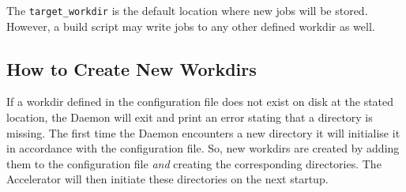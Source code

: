 The \texttt{target\_workdir} is the default location where new jobs
will be stored.  However, a build script may write jobs to any other
defined workdir as well.

\subsection{How to Create New Workdirs}
If a workdir defined in the configuration file does not exist on disk
at the stated location, the Daemon will exit and print an error
stating that a directory is missing.  The first time the Daemon
encounters a new directory it will initialise it in accordance with
the configuration file.  So, new workdirs are created by adding them
to the configuration file \textsl{and} creating the corresponding
directories.  The Accelerator will then initiate these directories on
the next startup.












